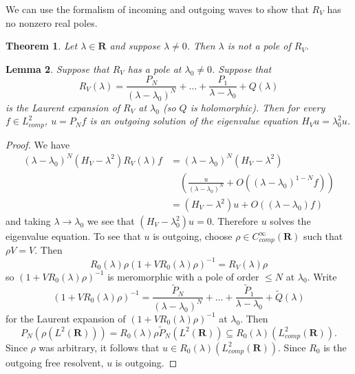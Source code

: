 \documentclass[12pt]{report}
\newcommand{\RR}{\mathbf{R}}
\newtheorem{theorem}{Theorem}[chapter]
\newtheorem{lemma}[theorem]{Lemma}
\theoremstyle{definition}
\begin{document}
We can use the formalism of incoming and outgoing waves to show that $R_V$ has no nonzero real poles.
\begin{theorem}
\label{real poles are zero}
Let $\lambda \in \RR$ and suppose $\lambda \neq 0$. Then $\lambda$ is not a pole of $R_V$.
\end{theorem}
\begin{lemma}
\label{laurent expansion of the resolvent}
Suppose that $R_V$ has a pole at $\lambda_0 \neq 0$. Suppose that
$$R_V(\lambda) = \frac{P_N}{(\lambda - \lambda_0)^N} + \dots + \frac{P_1}{\lambda - \lambda_0} + Q(\lambda)$$
is the Laurent expansion of $R_V$ at $\lambda_0$ (so $Q$ is holomorphic). Then for every $f \in L^2_{comp}$, $u = P_Nf$ is an outgoing solution of the eigenvalue equation $H_Vu = \lambda_0^2u$.
\end{lemma}
\begin{proof}
We have
\begin{align*}
  (\lambda - \lambda_0)^N(H_V - \lambda^2)R_V(\lambda)f &= (\lambda - \lambda_0)^N (H_V - \lambda^2)\\
  &\quad\left(\frac{u}{(\lambda - \lambda_0)^N} + O((\lambda - \lambda_0)^{1-N}f)\right)\\
  &= (H_V - \lambda^2)u + O((\lambda - \lambda_0)f)
\end{align*}
and taking $\lambda \to \lambda_0$ we see that $(H_V - \lambda_0^2)u = 0$. Therefore $u$ solves the eigenvalue equation. To see that $u$ is outgoing, choose $\rho \in C^\infty_{comp}(\RR)$ such that $\rho V = V$. Then
$$R_0(\lambda)\rho(1 + VR_0(\lambda)\rho)^{-1} = R_V(\lambda)\rho$$
so $(1 + VR_0(\lambda)\rho)^{-1}$ is meromorphic with a pole of order $\leq N$ at $\lambda_0$. Write
$$(1 + VR_0(\lambda)\rho)^{-1} = \frac{\tilde P_N}{(\lambda - \lambda_0)^N} + \dots + \frac{\tilde P_1}{\lambda - \lambda_0} + \tilde Q(\lambda)$$
for the Laurent expansion of $(1 + VR_0(\lambda)\rho)^{-1}$ at $\lambda_0$. Then
$$P_N(\rho(L^2(\RR))) = R_0(\lambda) \rho \tilde P_N(L^2(\RR)) \subseteq R_0(\lambda)(L^2_{comp}(\RR)).$$
Since $\rho$ was arbitrary, it follows that $u \in R_0(\lambda)(L^2_{comp}(\RR))$. Since $R_0$ is the outgoing free resolvent, $u$ is outgoing.
\end{proof}
\end{document}
